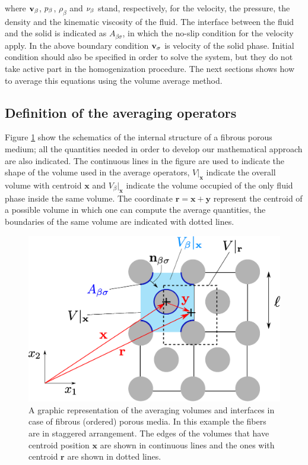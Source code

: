 where $\textbf{v}_{\beta}$, $p_{\beta}$, $\rho_{\beta}$ and $\nu_{\beta}$ stand, respectively, for  the velocity, the pressure, the density and the kinematic viscosity of the fluid.
The interface between the fluid and the solid is indicated as $A_{\beta\sigma}$, in which the no-slip condition for the velocity apply.
In the above boundary condition $\textbf{v}_{\sigma}$ is velocity of the solid phase.
Initial condition should also be specified in order to solve the system, but they do not take active part in the homogenization procedure.
The next sections shows how to average this equations using the volume average method.

\subsection{Definition of the averaging operators}
Figure \ref{fig:rev} show the schematics of the internal structure of a fibrous porous medium; all the quantities needed in order to develop our mathematical approach are also indicated.
The continuous lines in the figure are used to indicate the shape of the volume used in the average operators, $V|_{\mathbf{x}}$ indicate the overall volume with centroid $\mathbf{x}$ and $V_{\beta}|_{\mathbf{x}}$ indicate the volume occupied of the only fluid phase inside the same volume.
The coordinate $\mathbf{r} = \mathbf{x} +\mathbf{y}$ represent the centroid of a possible volume in which one can compute the average quantities, the boundaries of the same volume are indicated with dotted lines.

\begin{figure}[h!]
	\centering
	\includegraphics[width=0.7\linewidth]{chapter_2/figure/REV}
	\caption{A graphic representation of the averaging volumes and interfaces in case of fibrous (ordered) porous media. In this example the fibers are in staggered arrangement. The edges of the volumes that have centroid position $\mathbf{x}$ are shown in continuous lines and the ones with centroid $\mathbf{r}$ are shown in dotted lines.}
	\label{fig:rev}
\end{figure}


